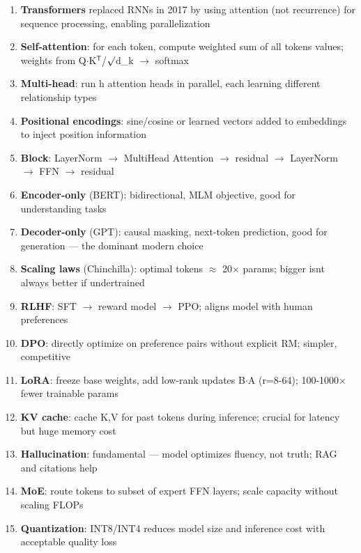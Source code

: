 \documentclass[11pt]{article}
\providecommand{\tightlist}{\setlength{\itemsep}{1pt}\setlength{\parskip}{0pt}}
\begin{document}
\begin{enumerate}
\def\labelenumi{\arabic{enumi}.}
\tightlist
\item
  \textbf{Transformers} replaced RNNs in 2017 by using attention (not recurrence) for sequence processing, enabling parallelization
\item
  \textbf{Self-attention}: for each token, compute weighted sum of all tokens\textquotesingle{} values; weights from Q\(\cdot\)K\(^{\mathsf{T}}\)/\(\surd\)d\_k \(\rightarrow\) softmax
\item
  \textbf{Multi-head}: run h attention heads in parallel, each learning different relationship types
\item
  \textbf{Positional encodings}: sine/cosine or learned vectors added to embeddings to inject position information
\item
  \textbf{Block}: LayerNorm \(\rightarrow\) MultiHead Attention \(\rightarrow\) residual \(\rightarrow\) LayerNorm \(\rightarrow\) FFN \(\rightarrow\) residual
\item
  \textbf{Encoder-only} (BERT): bidirectional, MLM objective, good for understanding tasks
\item
  \textbf{Decoder-only} (GPT): causal masking, next-token prediction, good for generation --- the dominant modern choice
\item
  \textbf{Scaling laws} (Chinchilla): optimal tokens \(\approx\) 20\(\times\) params; bigger isn\textquotesingle t always better if undertrained
\item
  \textbf{RLHF}: SFT \(\rightarrow\) reward model \(\rightarrow\) PPO; aligns model with human preferences
\item
  \textbf{DPO}: directly optimize on preference pairs without explicit RM; simpler, competitive
\item
  \textbf{LoRA}: freeze base weights, add low-rank updates B\(\cdot\)A (r=8-64); 100-1000\(\times\) fewer trainable params
\item
  \textbf{KV cache}: cache K,V for past tokens during inference; crucial for latency but huge memory cost
\item
  \textbf{Hallucination}: fundamental --- model optimizes fluency, not truth; RAG and citations help
\item
  \textbf{MoE}: route tokens to subset of expert FFN layers; scale capacity without scaling FLOPs
\item
  \textbf{Quantization}: INT8/INT4 reduces model size and inference cost with acceptable quality loss
\end{enumerate}
\end{document}
